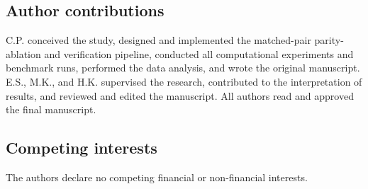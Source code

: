 \subsection*{Author contributions}

C.P. conceived the study, designed and implemented the matched-pair parity-ablation and verification pipeline, conducted all computational experiments and benchmark runs, performed the data analysis, and wrote the original manuscript. E.S., M.K., and H.K. supervised the research, contributed to the interpretation of results, and reviewed and edited the manuscript. All authors read and approved the final manuscript.

\subsection*{Competing interests}

The authors declare no competing financial or non-financial interests.
